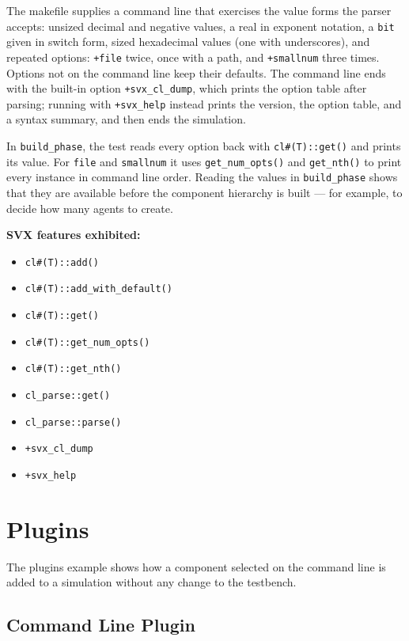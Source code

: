 \documentclass[11pt,letterpaper]{report}
\begin{document}
The makefile supplies a command line that exercises the value forms the parser accepts: unsized decimal and negative values, a real in exponent notation, a \texttt{bit} given in switch form, sized hexadecimal values (one with underscores), and repeated options: \texttt{+file} twice, once with a path, and \texttt{+smallnum} three times. Options not on the command line keep their defaults. The command line ends with the built-in option \texttt{+svx\_cl\_dump}, which prints the option table after parsing; running with \texttt{+svx\_help} instead prints the version, the option table, and a syntax summary, and then ends the simulation.

In \texttt{build\_phase}, the test reads every option back with \texttt{cl\#(T)::get()} and prints its value. For \texttt{file} and \texttt{smallnum} it uses \texttt{get\_num\_opts()} and \texttt{get\_nth()} to print every instance in command line order. Reading the values in \texttt{build\_phase} shows that they are available before the component hierarchy is built --- for example, to decide how many agents to create.

\textbf{SVX features exhibited:}

\begin{itemize}
  \item \texttt{cl\#(T)::add()}
  \item \texttt{cl\#(T)::add\_with\_default()}
  \item \texttt{cl\#(T)::get()}
  \item \texttt{cl\#(T)::get\_num\_opts()}
  \item \texttt{cl\#(T)::get\_nth()}
  \item \texttt{cl\_parse::get()}
  \item \texttt{cl\_parse::parse()}
  \item \texttt{+svx\_cl\_dump}
  \item \texttt{+svx\_help}
\end{itemize}
\chapter{Plugins}

The plugins example shows how a component selected on the command line is added to a simulation without any change to the testbench.

\section{Command Line Plugin}
\end{document}

